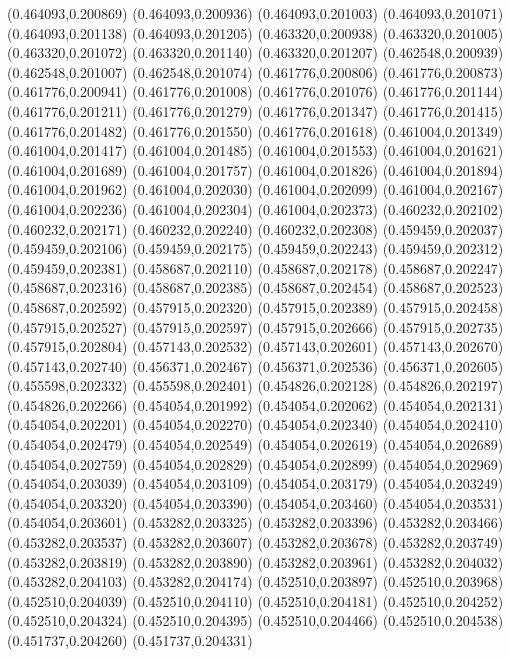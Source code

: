 (0.464093,0.200869)
(0.464093,0.200936)
(0.464093,0.201003)
(0.464093,0.201071)
(0.464093,0.201138)
(0.464093,0.201205)
(0.463320,0.200938)
(0.463320,0.201005)
(0.463320,0.201072)
(0.463320,0.201140)
(0.463320,0.201207)
(0.462548,0.200939)
(0.462548,0.201007)
(0.462548,0.201074)
(0.461776,0.200806)
(0.461776,0.200873)
(0.461776,0.200941)
(0.461776,0.201008)
(0.461776,0.201076)
(0.461776,0.201144)
(0.461776,0.201211)
(0.461776,0.201279)
(0.461776,0.201347)
(0.461776,0.201415)
(0.461776,0.201482)
(0.461776,0.201550)
(0.461776,0.201618)
(0.461004,0.201349)
(0.461004,0.201417)
(0.461004,0.201485)
(0.461004,0.201553)
(0.461004,0.201621)
(0.461004,0.201689)
(0.461004,0.201757)
(0.461004,0.201826)
(0.461004,0.201894)
(0.461004,0.201962)
(0.461004,0.202030)
(0.461004,0.202099)
(0.461004,0.202167)
(0.461004,0.202236)
(0.461004,0.202304)
(0.461004,0.202373)
(0.460232,0.202102)
(0.460232,0.202171)
(0.460232,0.202240)
(0.460232,0.202308)
(0.459459,0.202037)
(0.459459,0.202106)
(0.459459,0.202175)
(0.459459,0.202243)
(0.459459,0.202312)
(0.459459,0.202381)
(0.458687,0.202110)
(0.458687,0.202178)
(0.458687,0.202247)
(0.458687,0.202316)
(0.458687,0.202385)
(0.458687,0.202454)
(0.458687,0.202523)
(0.458687,0.202592)
(0.457915,0.202320)
(0.457915,0.202389)
(0.457915,0.202458)
(0.457915,0.202527)
(0.457915,0.202597)
(0.457915,0.202666)
(0.457915,0.202735)
(0.457915,0.202804)
(0.457143,0.202532)
(0.457143,0.202601)
(0.457143,0.202670)
(0.457143,0.202740)
(0.456371,0.202467)
(0.456371,0.202536)
(0.456371,0.202605)
(0.455598,0.202332)
(0.455598,0.202401)
(0.454826,0.202128)
(0.454826,0.202197)
(0.454826,0.202266)
(0.454054,0.201992)
(0.454054,0.202062)
(0.454054,0.202131)
(0.454054,0.202201)
(0.454054,0.202270)
(0.454054,0.202340)
(0.454054,0.202410)
(0.454054,0.202479)
(0.454054,0.202549)
(0.454054,0.202619)
(0.454054,0.202689)
(0.454054,0.202759)
(0.454054,0.202829)
(0.454054,0.202899)
(0.454054,0.202969)
(0.454054,0.203039)
(0.454054,0.203109)
(0.454054,0.203179)
(0.454054,0.203249)
(0.454054,0.203320)
(0.454054,0.203390)
(0.454054,0.203460)
(0.454054,0.203531)
(0.454054,0.203601)
(0.453282,0.203325)
(0.453282,0.203396)
(0.453282,0.203466)
(0.453282,0.203537)
(0.453282,0.203607)
(0.453282,0.203678)
(0.453282,0.203749)
(0.453282,0.203819)
(0.453282,0.203890)
(0.453282,0.203961)
(0.453282,0.204032)
(0.453282,0.204103)
(0.453282,0.204174)
(0.452510,0.203897)
(0.452510,0.203968)
(0.452510,0.204039)
(0.452510,0.204110)
(0.452510,0.204181)
(0.452510,0.204252)
(0.452510,0.204324)
(0.452510,0.204395)
(0.452510,0.204466)
(0.452510,0.204538)
(0.451737,0.204260)
(0.451737,0.204331)
